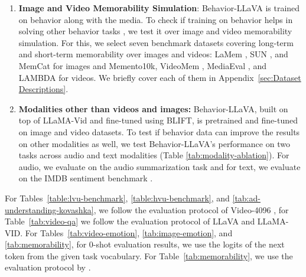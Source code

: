 \begin{enumerate}[wide]
    \item \textbf{Image and Video Memorability Simulation}: Behavior-LLaVA is trained on behavior along with the media. To check if training on behavior helps in solving other behavior tasks \cite{khandelwal2023large}, we test it over image and video memorability simulation. For this, we select seven benchmark datasets covering long-term and short-term memorability over images and videos: LaMem \cite{khosla2015understanding},  SUN \cite{isola2011makes}, and MemCat \cite{goetschalckx2019memcat} for images and 
    Memento10k\cite{newman2020multimodal}, VideoMem \cite{cohendet2019videomem},  MediaEval \cite{Kiziltepe2021}, and LAMBDA \cite{si2023long} for videos. We briefly cover each of them in Appendix~\ref{sec:Dataset Descriptions}.




    \item \textbf{Modalities other than videos and images:} Behavior-LLaVA, built on top of LLaMA-Vid and fine-tuned using BLIFT, is pretrained and fine-tuned on image and video datasets. To test if behavior data can improve the results on other modalities as well, we test Behavior-LLaVA's performance on two tasks across audio and text modalities (Table \ref{tab:modality-ablation}). For audio, we evaluate on the audio summarization task \cite{han2023shot2story20k} and for text, we evaluate on the IMDB sentiment benchmark \cite{maas-EtAl:2011:ACL-HLT2011}.

\end{enumerate}

For Tables~\ref{table:lvu-benchmark}, \ref{table:hvu-benchmark}, and \ref{tab:ad-understanding-kovashka}, we follow the evaluation protocol of Video-4096 \cite{bhattacharya2023video}, for Table~\ref{tab:video-qa} we follow the evaluation protocol of LLaVA and LLaMA-VID. For Tables~\ref{tab:video-emotion}, \ref{tab:image-emotion}, and \ref{tab:memorability}, for 0-shot evaluation results, we use the logits of the next token from the given task vocabulary. For Table~\ref{tab:memorability}, we use the evaluation protocol by \cite{si2023long}.




